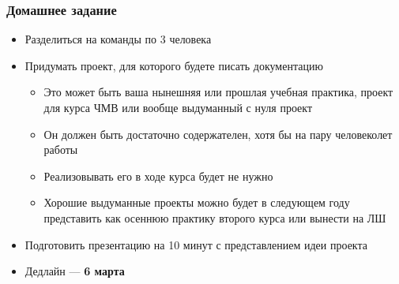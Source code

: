 \documentclass{../../slides-style}
\begin{document}
    \begin{frame}
        \frametitle{Домашнее задание}
        \begin{itemize}
            \item Разделиться на команды по 3 человека
            \item Придумать проект, для которого будете писать документацию
            \begin{itemize}
                \item Это может быть ваша нынешняя или прошлая учебная практика, проект для курса ЧМВ или вообще выдуманный с нуля проект
                \item Он должен быть достаточно содержателен, хотя бы на пару человеколет работы
                \item Реализовывать его в ходе курса будет не нужно
                \item Хорошие выдуманные проекты можно будет в следующем году представить как осеннюю практику второго курса или вынести на ЛШ
            \end{itemize}
            \item Подготовить презентацию на 10 минут с представлением идеи проекта
            \item Дедлайн --- \textbf{6 марта}
        \end{itemize}
    \end{frame}
\end{document}
